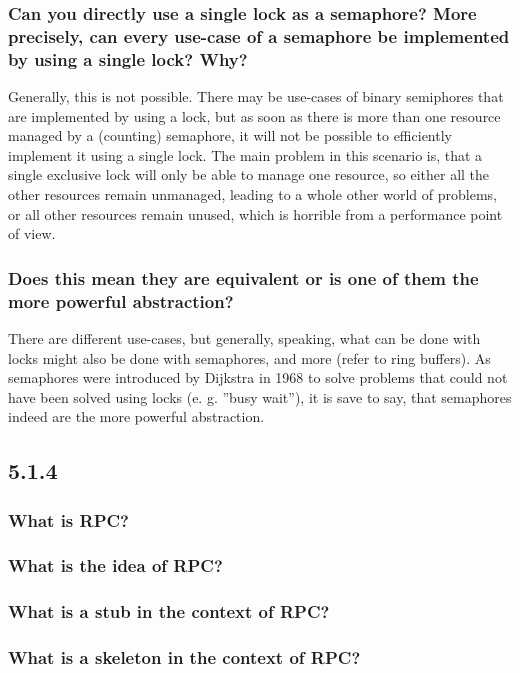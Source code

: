 \documentclass[12pt, a4paper]{article}
\begin{document}
\subsubsection*{Can you directly use a single lock as a semaphore? More precisely, can every use-case of 
a semaphore be implemented by using a single lock? Why?}
Generally, this is not possible. There may be use-cases of binary semiphores that are implemented by using a 
lock, but as soon as there is more than one resource managed by a (counting) semaphore, it will not be 
possible to efficiently implement it using a single lock. The main problem in this scenario is, that a single 
exclusive lock will only be able to manage one resource, so either all the other resources remain unmanaged, 
leading to a whole other world of problems, or all other resources remain unused, which is horrible from 
a performance point of view.

\subsubsection*{Does this mean they are equivalent or is one of them the more powerful abstraction?}
There are different use-cases, but generally, speaking, what can be done with locks might also be done with 
semaphores, and more (refer to ring buffers). As semaphores were introduced by Dijkstra in 1968 to solve problems 
that could not have been solved using locks (e. g. ''busy wait''), it is save to say, that semaphores indeed 
are the more powerful abstraction.

\subsection*{5.1.4}
\subsubsection*{What is RPC?}
\subsubsection*{What is the idea of RPC?}
\subsubsection*{What is a stub in the context of RPC?}
\subsubsection*{What is a skeleton in the context of RPC?}
\end{document}
